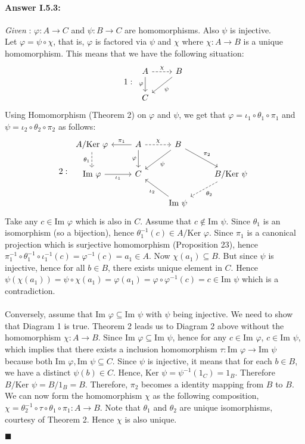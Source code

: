 \documentclass{article}
\theoremstyle{definition}
\theoremstyle{remark}
\theoremstyle{definition}
\theoremstyle{definition}
\newenvironment{customproof}[1]{\paragraph{Answer #1:}}{\hfill\ensuremath{\blacksquare}}
\newcommand{\inv}[1]{#1^{-1}}
\newcommand{\image}[0]{\text{Im }}
\newcommand{\kernel}[0]{\text{Ker }}
\begin{document}
\hrulefill
\begin{customproof}{I.5.3}
	\emph{Given} : $ \varphi : A \to C $ and $ \psi : B\to C $ are homomorphisms. Also $ \psi $ is injective.\\
	Let $ \varphi = \psi \circ \chi $, that is, $ \varphi $ is factored via $ \psi $ and $ \chi $ where $ \chi : A \to B $ is a unique homomorphism. This means that we have the following situation:
	\[1 :\;\begin{tikzcd}
		A \arrow[swap]{d}{\varphi} \arrow[dashed]{r}{\chi} &B \arrow{ld}{\psi}\\
		C
	\end{tikzcd}\]
Using Homomorphism (Theorem 2) on $ \varphi $ and $ \psi $, we get that $ \varphi =  \iota_1 \circ \theta_1 \circ \pi_1$ and $ \psi = \iota_2 \circ \theta_2 \circ \pi_2 $ as follows:
	\[2 :\;\begin{tikzcd}
A/\kernel \varphi \arrow[swap,dashed]{d}{\theta_1}	&A\arrow[swap]{l}{\pi_1} \arrow[swap]{d}{\varphi} \arrow[dashed]{r}{\chi}&B \arrow{ld}{\psi} \arrow{dr}{\pi_2}\\
\image \varphi \arrow[swap]{r}{\iota_1}	&C & &B/\kernel \psi \arrow[dashed]{dl}{\theta_2} \\
&&\image \psi \arrow{ul}{\iota_2}
\end{tikzcd}\]
Take any $ c\in \image \varphi $ which is also in $ C $. Assume that $ c\not \in \image \psi $. Since $ \theta_1$ is an isomorphism (so a bijection), hence $ \inv{\theta_1}(c) \in A/\kernel\varphi $. Since $ \pi_1 $ is a canonical projection which is surjective homomorphism (Proposition 23), hence $ \inv{\pi_1}\circ \inv{\theta_1}\circ \inv{\iota_1}(c) = \inv{\varphi}(c) = a_1\in A $. Now $ \chi(a_1) \subseteq B $. But since $ \psi $ is injective, hence for all $ b\in B $, there exists unique element in $ C $. Hence $ \psi(\chi(a_1)) = \psi\circ \chi (a_1) = \varphi(a_1) = \varphi\circ \inv{\varphi}  (c) = c \in \image\psi$ which is a contradiction.\\\\
Conversely, assume that $ \image \varphi \subseteq \image \psi $ with $ \psi $ being injective. We need to show that Diagram 1 is true. Theorem 2 leads us to Diagram 2 above without the homomorphism $ \chi : A \to B $. Since $ \image \varphi \subseteq \image \psi $, hence for any $ c \in  \image \varphi $, $ c\in \image \psi $, which implies that there exists a inclusion homomorphism $ \tau : \image \varphi \to \image \psi $ because both $ \image \varphi,\image \psi \subseteq C $. Since $ \psi $ is injective, it means that for each $ b\in B $, we have a distinct $ \psi(b)\in C $. Hence, $ \kernel \psi = \inv{\psi}(1_C) = 1_B $. Therefore $ B/\kernel\psi = B/1_B = B$. Therefore, $ \pi_2 $ becomes a identity mapping from $ B $ to $ B $. We can now form the homomorphism $ \chi $ as the following composition, $ \chi =  \inv{\theta_2}\circ\tau\circ\theta_1\circ\pi_1 : A \to B$. Note that $ \theta_1 $ and $ \theta_2 $ are unique isomorphisms, courtesy of Theorem 2. Hence $ \chi $ is also unique.

\end{customproof}
\end{document}
